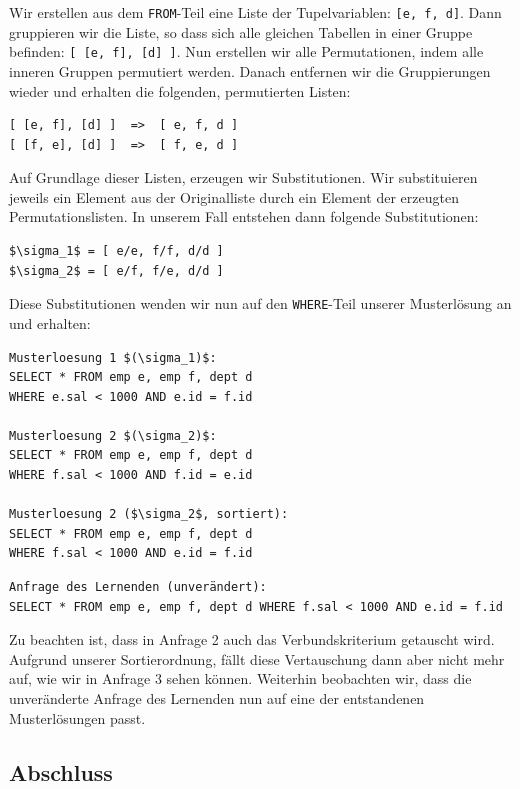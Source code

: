 Wir erstellen aus dem \verb|FROM|-Teil eine Liste der Tupelvariablen: \verb|[e, f, d]|. Dann gruppieren wir die Liste, so dass sich alle gleichen Tabellen in einer Gruppe befinden: \verb|[ [e, f], [d] ]|. Nun erstellen wir alle Permutationen, indem alle inneren Gruppen permutiert werden. Danach entfernen wir die Gruppierungen wieder und erhalten die folgenden, permutierten Listen:
\begin{verbatim}
[ [e, f], [d] ]  =>  [ e, f, d ]
[ [f, e], [d] ]  =>  [ f, e, d ]
\end{verbatim}

Auf Grundlage dieser Listen, erzeugen wir Substitutionen. Wir substituieren jeweils ein Element aus der Originalliste durch ein Element der erzeugten Permutationslisten. In unserem Fall entstehen dann folgende Substitutionen:

\begin{lstlisting}[mathescape]
$\sigma_1$ = [ e/e, f/f, d/d ]
$\sigma_2$ = [ e/f, f/e, d/d ]
\end{lstlisting}

Diese Substitutionen wenden wir nun auf den \verb|WHERE|-Teil unserer Musterlösung an und erhalten:

\begin{lstlisting}[mathescape]
Musterloesung 1 $(\sigma_1)$:
SELECT * FROM emp e, emp f, dept d 
WHERE e.sal < 1000 AND e.id = f.id 

Musterloesung 2 $(\sigma_2)$: 
SELECT * FROM emp e, emp f, dept d 
WHERE f.sal < 1000 AND f.id = e.id 

Musterloesung 2 ($\sigma_2$, sortiert): 
SELECT * FROM emp e, emp f, dept d 
WHERE f.sal < 1000 AND e.id = f.id 
\end{lstlisting}
\begin{verbatim}
Anfrage des Lernenden (unverändert):
SELECT * FROM emp e, emp f, dept d WHERE f.sal < 1000 AND e.id = f.id
\end{verbatim}


Zu beachten ist, dass in Anfrage 2 auch das Verbundskriterium getauscht wird. Aufgrund unserer Sortierordnung, fällt diese Vertauschung dann aber nicht mehr auf, wie wir in Anfrage 3 sehen können. Weiterhin beobachten wir, dass die unveränderte Anfrage des Lernenden nun auf eine der entstandenen Musterlösungen passt.

\subsection{Abschluss}

